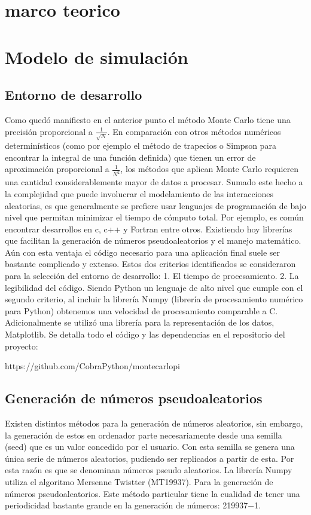 \documentclass[sigconf, nonacm]{acmart}
\begin{document}
\section{marco teorico}
\section{Modelo de simulación}
\subsection{Entorno de desarrollo}

Como quedó manifiesto en el anterior punto el método Monte Carlo tiene una precisión proporcional a $\frac{1}{\sqrt{N}}$. En comparación con otros métodos numéricos determinísticos (como por ejemplo el método de trapecios o Simpson para encontrar la integral de una función definida) que tienen un error de aproximación proporcional a $\frac{1}{N^2}$, los métodos que aplican Monte Carlo requieren una cantidad considerablemente mayor de datos a procesar. Sumado este hecho a la complejidad que puede involucrar el modelamiento de las interacciones aleatorias, es que generalmente se prefiere usar lenguajes de programación de bajo nivel que permitan minimizar el tiempo de cómputo total.
Por ejemplo, es común encontrar desarrollos en c, c++ y Fortran entre otros. Existiendo hoy librerías que facilitan la generación de números pseudoaleatorios y el manejo matemático. Aún con esta ventaja el código necesario para una aplicación final suele ser bastante complicado y extenso.
Estos dos criterios identificados se consideraron para la selección del entorno de desarrollo:
1. El tiempo de procesamiento.
2. La legibilidad del código.
Siendo Python un lenguaje de alto nivel que cumple con el segundo criterio, al incluir la librería Numpy (librería de procesamiento numérico para Python) obtenemos una velocidad de procesamiento comparable a C. Adicionalmente se utilizó una librería para la representación de los datos, Matplotlib.
Se detalla todo el código y las dependencias en el repositorio del proyecto:

https://github.com/CobraPython/montecarlopi


\subsection{Generación de números pseudoaleatorios}

Existen distintos métodos para la generación de números aleatorios, sin embargo, la generación de estos en ordenador parte necesariamente desde una semilla (seed) que es un valor concedido por el usuario. Con esta semilla se genera una única serie de números aleatorios, pudiendo ser replicados a partir de esta. Por esta razón es que se denominan números pseudo aleatorios.
La librería Numpy utiliza el algoritmo Mersenne Twistter (MT19937). \cite{Tanguy}
Para la generación de números pseudoaleatorios. Este método particular tiene la cualidad de tener una periodicidad bastante grande en la generación de números: 219937−1. \cite{Makoto}
\end{document}
